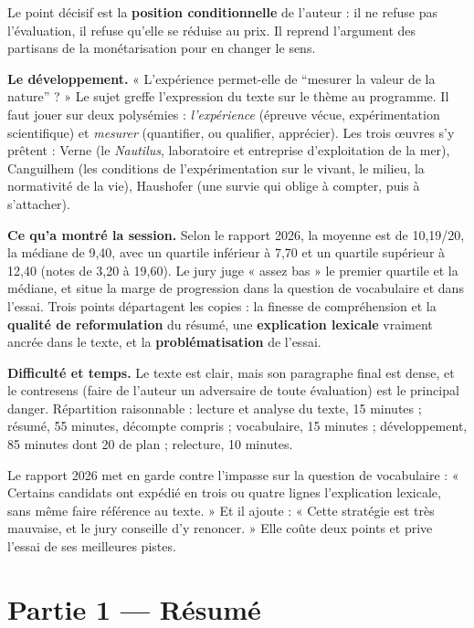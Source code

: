 \documentclass[11pt,a4paper]{article}
\begin{document}
Le point décisif est la \textbf{position conditionnelle} de l'auteur : il ne refuse pas l'évaluation, il refuse qu'elle se réduise au prix. Il reprend l'argument des partisans de la monétarisation pour en changer le sens.

\textbf{Le développement.} « L'expérience permet-elle de ``mesurer la valeur de la nature'' ? » Le sujet greffe l'expression du texte sur le thème au programme. Il faut jouer sur deux polysémies : \emph{l'expérience} (épreuve vécue, expérimentation scientifique) et \emph{mesurer} (quantifier, ou qualifier, apprécier). Les trois œuvres s'y prêtent : Verne (le \emph{Nautilus}, laboratoire et entreprise d'exploitation de la mer), Canguilhem (les conditions de l'expérimentation sur le vivant, le milieu, la normativité de la vie), Haushofer (une survie qui oblige à compter, puis à s'attacher).

\textbf{Ce qu'a montré la session.} Selon le rapport 2026, la moyenne est de 10,19/20, la médiane de 9,40, avec un quartile inférieur à 7,70 et un quartile supérieur à 12,40 (notes de 3,20 à 19,60). Le jury juge « assez bas » le premier quartile et la médiane, et situe la marge de progression dans la question de vocabulaire et dans l'essai. Trois points départagent les copies : la finesse de compréhension et la \textbf{qualité de reformulation} du résumé, une \textbf{explication lexicale} vraiment ancrée dans le texte, et la \textbf{problématisation} de l'essai.

\textbf{Difficulté et temps.} Le texte est clair, mais son paragraphe final est dense, et le contresens (faire de l'auteur un adversaire de toute évaluation) est le principal danger. Répartition raisonnable : lecture et analyse du texte, 15 minutes ; résumé, 55 minutes, décompte compris ; vocabulaire, 15 minutes ; développement, 85 minutes dont 20 de plan ; relecture, 10 minutes.

\begin{jury}

Le rapport 2026 met en garde contre l'impasse sur la question de vocabulaire : « Certains candidats ont expédié en trois ou quatre lignes l'explication lexicale, sans même faire référence au texte. » Et il ajoute : « Cette stratégie est très mauvaise, et le jury conseille d'y renoncer. » Elle coûte deux points et prive l'essai de ses meilleures pistes.

\end{jury}

\hypertarget{partie-1-ruxe9sumuxe9}{%
\section{Partie 1 --- Résumé}\label{partie-1-ruxe9sumuxe9}}
\end{document}
